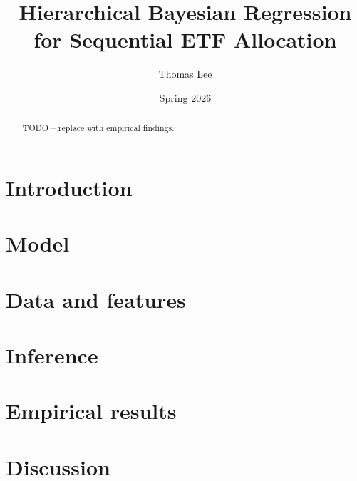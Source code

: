 \documentclass[11pt]{article}
\title{Hierarchical Bayesian Regression for Sequential ETF Allocation}
\author{Thomas Lee}
\date{Spring 2026}
\begin{document}
\maketitle

\begin{abstract}
TODO -- replace with empirical findings.
\end{abstract}

\section{Introduction}
\section{Model}
\section{Data and features}
\section{Inference}
\section{Empirical results}
\section{Discussion}



\end{document}
